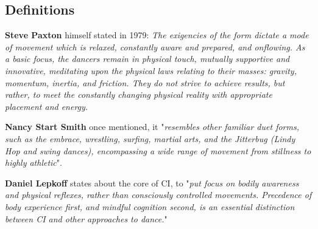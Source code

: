 \subsection{Definitions}

\textbf{Steve Paxton} himself stated in 1979: \textit{The exigencies of the form dictate a mode of movement which is relaxed, constantly aware and prepared, and onflowing. As a basic focus, the dancers remain in physical touch, mutually supportive and innovative, meditating upon the physical laws relating to their masses: gravity, momentum, inertia, and friction. They do not strive to achieve results, but rather, to meet the constantly changing physical reality with appropriate placement and energy.}

\textbf{Nancy Start Smith} once mentioned, it "\textit{resembles other familiar duet forms, such as the embrace, wrestling, surfing, martial arts, and the Jitterbug (Lindy Hop and swing dances), encompassing a wide range of movement from stillness to highly athletic}".

\textbf{Daniel Lepkoff} states about the core of CI, to "\textit{put focus on bodily awareness and physical reflexes, rather than consciously controlled movements. Precedence of body experience first, and mindful cognition second, is an essential distinction between CI and other approaches to dance.}"
